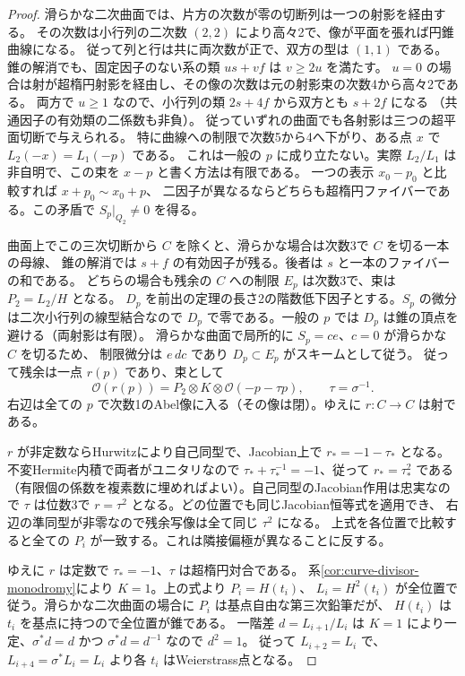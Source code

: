 \begin{proof}
滑らかな二次曲面では、片方の次数が零の切断列は一つの射影を経由する。
その次数は小行列の二次数 $(2,2)$ により高々2で、像が平面を張れば円錐曲線になる。
従って列と行は共に両次数が正で、双方の型は $(1,1)$ である。
錐の解消でも、固定因子のない系の類 $u s+v f$ は $v\ge2u$ を満たす。
$u=0$ の場合は射が超楕円射影を経由し、その像の次数は元の射影束の次数4から高々2である。
両方で $u\ge1$ なので、小行列の類 $2s+4f$ から双方とも $s+2f$ になる
（共通因子の有効類の二係数も非負）。
従っていずれの曲面でも各射影は三つの超平面切断で与えられる。
特に曲線への制限で次数5から4へ下がり、ある点 $x$ で $L_2(-x)=L_1(-p)$ である。
これは一般の $p$ に成り立たない。実際 $L_2/L_1$ は非自明で、この束を $x-p$ と書く方法は有限である。
一つの表示 $x_0-p_0$ と比較すれば $x+p_0\sim x_0+p$、
二因子が異なるならどちらも超楕円ファイバーである。この矛盾で $S_p|_{Q_2}\ne0$ を得る。

曲面上でこの三次切断から $C$ を除くと、滑らかな場合は次数3で $C$ を切る一本の母線、
錐の解消では $s+f$ の有効因子が残る。後者は $s$ と一本のファイバーの和である。
どちらの場合も残余の $C$ への制限 $E_p$ は次数3で、束は $P_2=L_2/H$ となる。
$D_p$ を前出の定理の長さ2の階数低下因子とする。$S_p$ の微分は二次小行列の線型結合なので
$D_p$ で零である。一般の $p$ では $D_p$ は錐の頂点を避ける（両射影は有限）。
滑らかな曲面で局所的に $S_p=c e$、$c=0$ が滑らかな $C$ を切るため、
制限微分は $e\,dc$ であり $D_p\subset E_p$ がスキームとして従う。
従って残余は一点 $r(p)$ であり、束として
\[
 \mathcal O(r(p))=P_2\otimes K\otimes\mathcal O(-p-\tau p),\qquad \tau=\sigma^{-1}.
\]
右辺は全ての $p$ で次数1のAbel像に入る（その像は閉）。ゆえに $r:C\to C$ は射である。

$r$ が非定数ならHurwitzにより自己同型で、Jacobian上で $r_*=-1-\tau_*$ となる。
不変Hermite内積で両者がユニタリなので $\tau_*+\tau_*^{-1}=-1$、従って $r_*=\tau_*^2$ である
（有限個の係数を複素数に埋めればよい）。自己同型のJacobian作用は忠実なので
$\tau$ は位数3で $r=\tau^2$ となる。どの位置でも同じJacobian恒等式を適用でき、
右辺の準同型が非零なので残余写像は全て同じ $\tau^2$ になる。
上式を各位置で比較すると全ての $P_i$ が一致する。これは隣接偏極が異なることに反する。

ゆえに $r$ は定数で $\tau_*=-1$、$\tau$ は超楕円対合である。
系\ref{cor:curve-divisor-monodromy}により $K=1$。上の式より $P_i=H(t_i)$、
$L_i=H^2(t_i)$ が全位置で従う。滑らかな二次曲面の場合に $P_i$ は基点自由な第三次鉛筆だが、
$H(t_i)$ は $t_i$ を基点に持つので全位置が錐である。
一階差 $d=L_{i+1}/L_i$ は $K=1$ により一定、$\sigma^*d=d$ かつ $\sigma^*d=d^{-1}$ なので $d^2=1$。
従って $L_{i+2}=L_i$ で、$L_{i+4}=\sigma^*L_i=L_i$ より各 $t_i$ はWeierstrass点となる。
\end{proof}

